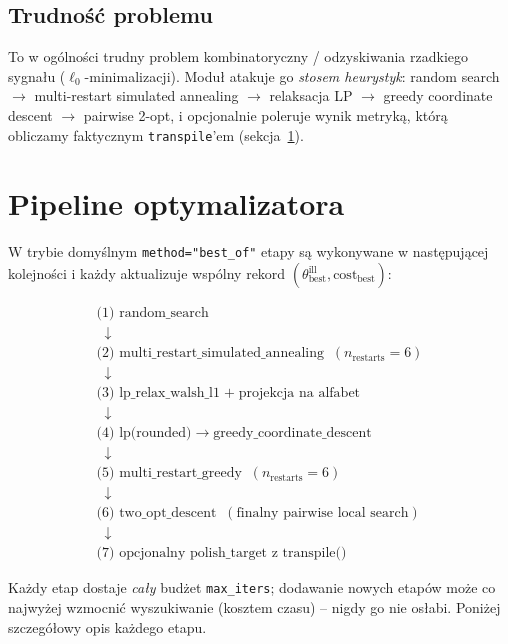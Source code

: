 \documentclass[11pt,a4paper]{article}
\newcommand{\1}{\mathbf{1}}
\newcommand{\code}[1]{\texttt{#1}}
\begin{document}
\subsection{Trudność problemu}

To w ogólności trudny problem kombinatoryczny / odzyskiwania rzadkiego
sygnału ($\ell_{0}$-minimalizacji). Moduł atakuje go \emph{stosem
heurystyk}: random search $\to$ multi-restart simulated annealing $\to$
relaksacja LP $\to$ greedy coordinate descent $\to$ pairwise 2-opt,
i opcjonalnie poleruje wynik metryką, którą obliczamy faktycznym
\code{transpile}'em (sekcja~\ref{sec:pipeline}).

\section{Pipeline optymalizatora}
\label{sec:pipeline}

W trybie domyślnym \code{method="best\_of"} etapy są wykonywane w
następującej kolejności i każdy aktualizuje wspólny rekord
$(\theta^{\mathrm{ill}}_{\mathrm{best}}, \mathrm{cost}_{\mathrm{best}})$:

\begin{equation*}
\boxed{\;
\begin{array}{l}
\text{(1) random\_search}\\
\;\;\downarrow\\
\text{(2) multi\_restart\_simulated\_annealing}\;\;(n_\mathrm{restarts}=6)\\
\;\;\downarrow\\
\text{(3) lp\_relax\_walsh\_l1}\;+\;\text{projekcja na alfabet}\\
\;\;\downarrow\\
\text{(4) lp(rounded)}\;\to\;\text{greedy\_coordinate\_descent}\\
\;\;\downarrow\\
\text{(5) multi\_restart\_greedy}\;\;(n_\mathrm{restarts}=6)\\
\;\;\downarrow\\
\text{(6) two\_opt\_descent}\;\;(\text{finalny pairwise local search})\\
\;\;\downarrow\\
\text{(7) opcjonalny polish\_target z transpile()}
\end{array}\;}
\end{equation*}

Każdy etap dostaje \emph{cały} budżet \code{max\_iters}; dodawanie
nowych etapów może co najwyżej wzmocnić wyszukiwanie (kosztem czasu) --
nigdy go nie osłabi. Poniżej szczegółowy opis każdego etapu.
\end{document}
